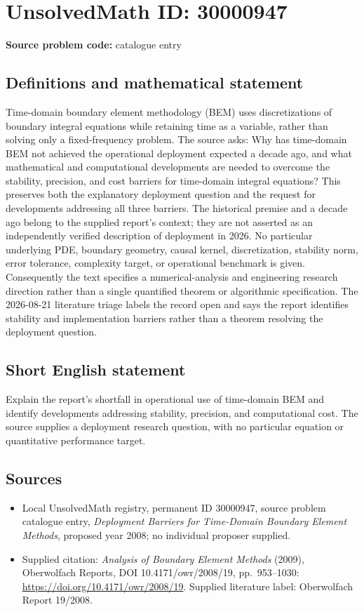 \documentclass[11pt]{article}
\begin{document}
\section*{UnsolvedMath ID: 30000947}
\textbf{Source problem code:} catalogue entry
\subsection{Definitions and mathematical statement}
Time-domain boundary element methodology (BEM) uses discretizations of boundary integral equations while retaining time as a variable, rather than solving only a fixed-frequency problem. The source asks: Why has time-domain BEM not achieved the operational deployment expected a decade ago, and what mathematical and computational developments are needed to overcome the stability, precision, and cost barriers for time-domain integral equations? This preserves both the explanatory deployment question and the request for developments addressing all three barriers. The historical premise and a decade ago belong to the supplied report's context; they are not asserted as an independently verified description of deployment in 2026. No particular underlying PDE, boundary geometry, causal kernel, discretization, stability norm, error tolerance, complexity target, or operational benchmark is given. Consequently the text specifies a numerical-analysis and engineering research direction rather than a single quantified theorem or algorithmic specification. The 2026-08-21 literature triage labels the record open and says the report identifies stability and implementation barriers rather than a theorem resolving the deployment question.
\subsection{Short English statement}
Explain the report's shortfall in operational use of time-domain BEM and identify developments addressing stability, precision, and computational cost. The source supplies a deployment research question, with no particular equation or quantitative performance target.
\subsection{Sources}
\begin{itemize}\item Local UnsolvedMath registry, permanent ID 30000947, source problem catalogue entry, \emph{Deployment Barriers for Time-Domain Boundary Element Methods}, proposed year 2008; no individual proposer supplied.\item Supplied citation: \emph{Analysis of Boundary Element Methods} (2009), Oberwolfach Reports, DOI 10.4171/owr/2008/19, pp.\ 953--1030: \url{https://doi.org/10.4171/owr/2008/19}. Supplied literature label: Oberwolfach Report 19/2008.\end{itemize}
\end{document}
